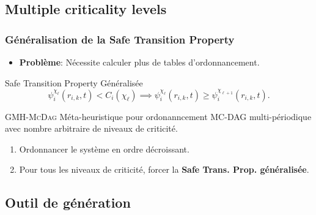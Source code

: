 \documentclass[xcolor=table]{beamer}
\begin{document}
\subsection{Multiple criticality levels}

\begin{frame}
	\frametitle{Généralisation de la Safe Transition Property}
	
	\begin{itemize}
		\item \textbf{Problème}: Nécessite calculer plus de tables d'ordonnancement.
	\end{itemize}
	
	\begin{exampleblock}{Safe Transition Property Généralisée}
		\begin{equation}
		\psi_i^{\chi_\ell} (r_{i,k}, t) < C_i(\chi_\ell) \implies 
		\psi_i^{\chi_\ell}(r_{i,k}, t) \geq 
		\psi_i^{\chi_{\ell+1}}(r_{i,k},t).
		\label{eq:start_n_mode_lo}
		\end{equation}
	\end{exampleblock}
	
	\begin{exampleblock}{\textsc{GMH-McDag}}
		Méta-heuristique pour ordonanncement MC-DAG multi-périodique  avec nombre arbitraire de 
		niveaux de criticité.
		\begin{enumerate}
			\item Ordonnancer le système en ordre décroissant.
			\item Pour tous les niveaux de criticité, forcer la \textbf{Safe Trans. Prop. généralisée}.
		\end{enumerate}
	\end{exampleblock}
\end{frame}


\subsection{Outil de génération}
\end{document}
